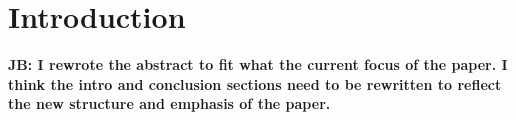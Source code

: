 \documentclass[sn-mathphys,Numbered]{sn-jnl}
\newcommand*{\xblue}{\color{blue}}
\begin{document}


\date{January 2024, To be published in International Journal of Theoretical Physics}


\maketitle

\section{Introduction}
\label{sec1}
{\bf JB: I rewrote the abstract to fit what the current focus of the paper. I think the intro and conclusion sections need to be rewritten to reflect the new structure and emphasis of the paper.}


\end{document}
